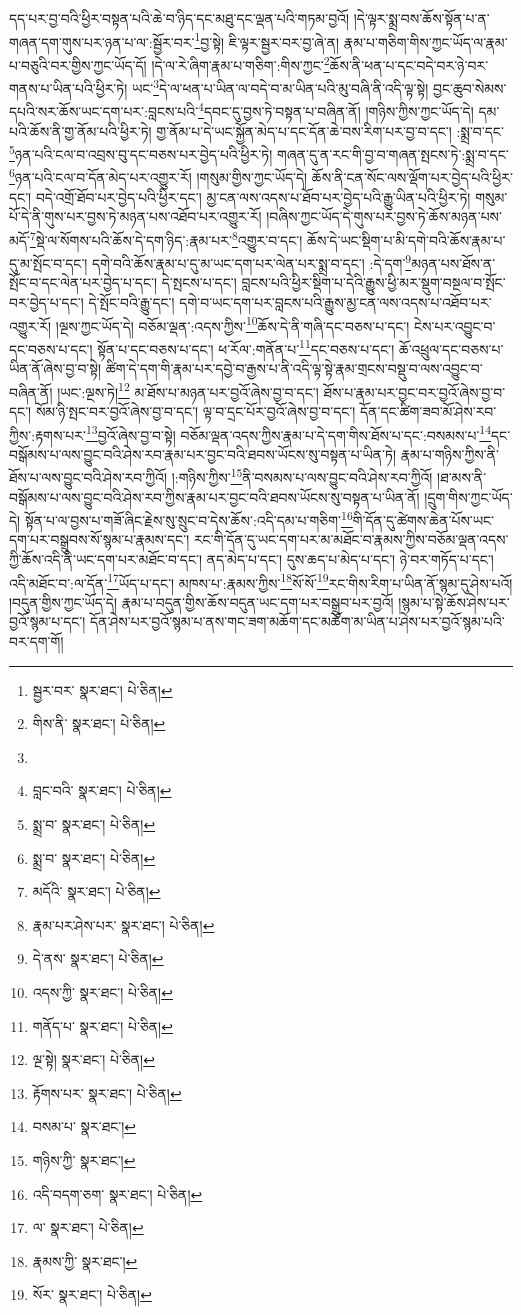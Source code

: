 དད་པར་བྱ་བའི་ཕྱིར་བསྟན་པའི་ཆེ་བ་ཉིད་དང་མཐུ་དང་ལྡན་པའི་གཏམ་བྱའོ། །དེ་ལྟར་སྨྲ་བས་ཆོས་སྟོན་པ་ན་གཞན་དག་གུས་པར་ཉན་པ་ལ་:སྦྱོར་བར་\footnote{སྦྱར་བར་  སྣར་ཐང་།  པེ་ཅིན། }བྱ་སྟེ། ཇི་ལྟར་སྦྱར་བར་བྱ་ཞེ་ན། རྣམ་པ་གཅིག་གིས་ཀྱང་ཡོད་ལ་རྣམ་པ་བཅུའི་བར་གྱིས་ཀྱང་ཡོད་དོ། །དེ་ལ་རེ་ཞིག་རྣམ་པ་གཅིག་:གིས་ཀྱང་\footnote{གིས་ནི་  སྣར་ཐང་།  པེ་ཅིན། }ཆོས་ནི་ཕན་པ་དང་བདེ་བར་ཉེ་བར་གནས་པ་ཡིན་པའི་ཕྱིར་ཏེ། ཡང་\footnote{}དེ་ལ་ཕན་པ་ཡིན་ལ་བདེ་བ་མ་ཡིན་པའི་མུ་བཞི་ནི་འདི་ལྟ་སྟེ། བྱང་ཆུབ་སེམས་དཔའི་སར་ཆོས་ཡང་དག་པར་:བླངས་པའི་\footnote{བླང་བའི་  སྣར་ཐང་།  པེ་ཅིན། }དབང་དུ་བྱས་ཏེ་བསྟན་པ་བཞིན་ནོ། །གཉིས་ཀྱིས་ཀྱང་ཡོད་དེ། དམ་པའི་ཆོས་ནི་གྱ་ནོམ་པའི་ཕྱིར་ཏེ། གྱ་ནོམ་པ་དེ་ཡང་སྐྱོན་མེད་པ་དང་དོན་ཆེ་བས་རིག་པར་བྱ་བ་དང་། :སྨྲ་བ་དང་\footnote{སྨྲ་བ་  སྣར་ཐང་།  པེ་ཅིན། }ཉན་པའི་ངལ་བ་འབྲས་བུ་དང་བཅས་པར་བྱེད་པའི་ཕྱིར་ཏེ། གཞན་དུ་ན་རང་གི་བྱ་བ་གཞན་སྤངས་ཏེ་:སྨྲ་བ་དང་\footnote{སྨྲ་བ་  སྣར་ཐང་།  པེ་ཅིན། }ཉན་པའི་ངལ་བ་དོན་མེད་པར་འགྱུར་རོ། །གསུམ་གྱིས་ཀྱང་ཡོད་དེ། ཆོས་ནི་ངན་སོང་ལས་ལྡོག་པར་བྱེད་པའི་ཕྱིར་དང་། བདེ་འགྲོ་ཐོབ་པར་བྱེད་པའི་ཕྱིར་དང་། མྱ་ངན་ལས་འདས་པ་ཐོབ་པར་བྱེད་པའི་རྒྱུ་ཡིན་པའི་ཕྱིར་ཏེ། གསུམ་པོ་དེ་ནི་གུས་པར་བྱས་ཏེ་མཉན་པས་འཐོབ་པར་འགྱུར་རོ། །བཞིས་ཀྱང་ཡོད་དེ་གུས་པར་བྱས་ཏེ་ཆོས་མཉན་པས་མདོ་\footnote{མདོའི་  སྣར་ཐང་།  པེ་ཅིན། }སྡེ་ལ་སོགས་པའི་ཆོས་དེ་དག་ཉིད་:རྣམ་པར་\footnote{རྣམ་པར་ཤེས་པར་  སྣར་ཐང་།  པེ་ཅིན། }འགྱུར་བ་དང་། ཆོས་དེ་ཡང་སྡིག་པ་མི་དགེ་བའི་ཆོས་རྣམ་པ་དུ་མ་སྤོང་བ་དང་། དགེ་བའི་ཆོས་རྣམ་པ་དུ་མ་ཡང་དག་པར་ལེན་པར་སྨྲ་བ་དང་། :དེ་དག་\footnote{དེ་ནས་  སྣར་ཐང་།  པེ་ཅིན། }མཉན་པས་ཐོས་ན་སྤོང་བ་དང་ལེན་པར་བྱེད་པ་དང་། དེ་སྤངས་པ་དང་། བླངས་པའི་ཕྱིར་སྡིག་པ་དེའི་རྒྱུས་ཕྱི་མར་སྡུག་བསྔལ་བ་སྤོང་བར་བྱེད་པ་དང་། དེ་སྤོང་བའི་རྒྱུ་དང་། དགེ་བ་ཡང་དག་པར་བླངས་པའི་རྒྱུས་མྱ་ངན་ལས་འདས་པ་འཐོབ་པར་འགྱུར་རོ། །ལྔས་ཀྱང་ཡོད་དེ། བཅོམ་ལྡན་:འདས་ཀྱིས་\footnote{འདས་ཀྱི་  སྣར་ཐང་།  པེ་ཅིན། }ཆོས་དེ་ནི་གཞི་དང་བཅས་པ་དང་། ངེས་པར་འབྱུང་བ་དང་བཅས་པ་དང་། སྟོན་པ་དང་བཅས་པ་དང་། ཕ་རོལ་:གནོན་པ་\footnote{གནོད་པ་  སྣར་ཐང་།  པེ་ཅིན། }དང་བཅས་པ་དང་། ཆོ་འཕྲུལ་དང་བཅས་པ་ཡིན་ནོ་ཞེས་བྱ་བ་སྟེ། ཚིག་དེ་དག་གི་རྣམ་པར་དབྱེ་བ་རྒྱས་པ་ནི་འདི་ལྟ་སྟེ་རྣམ་གྲངས་བསྡུ་བ་ལས་འབྱུང་བ་བཞིན་ནོ། །ཡང་:ལྔས་ཏེ།\footnote{ལྔ་སྟེ།  སྣར་ཐང་།  པེ་ཅིན། } མ་ཐོས་པ་མཉན་པར་བྱའོ་ཞེས་བྱ་བ་དང་། ཐོས་པ་རྣམ་པར་བྱང་བར་བྱའོ་ཞེས་བྱ་བ་དང་། སོམ་ཉི་སྤང་བར་བྱའོ་ཞེས་བྱ་བ་དང་། ལྟ་བ་དྲང་པོར་བྱའོ་ཞེས་བྱ་བ་དང་། དོན་དང་ཚིག་ཟབ་མོ་ཤེས་རབ་ཀྱིས་:རྟགས་པར་\footnote{རྟོགས་པར་  སྣར་ཐང་།  པེ་ཅིན། }བྱའོ་ཞེས་བྱ་བ་སྟེ། བཅོམ་ལྡན་འདས་ཀྱིས་རྣམ་པ་དེ་དག་གིས་ཐོས་པ་དང་:བསམས་པ་\footnote{བསམ་པ་  སྣར་ཐང་། }དང་བསྒོམས་པ་ལས་བྱུང་བའི་ཤེས་རབ་རྣམ་པར་བྱང་བའི་ཐབས་ཡོངས་སུ་བསྟན་པ་ཡིན་ཏེ། རྣམ་པ་གཉིས་ཀྱིས་ནི་ཐོས་པ་ལས་བྱུང་བའི་ཤེས་རབ་ཀྱིའོ། །:གཉིས་ཀྱིས་\footnote{གཉིས་ཀྱི་  སྣར་ཐང་། }ནི་བསམས་པ་ལས་བྱུང་བའི་ཤེས་རབ་ཀྱིའོ། །ཐ་མས་ནི་བསྒོམས་པ་ལས་བྱུང་བའི་ཤེས་རབ་ཀྱིས་རྣམ་པར་བྱང་བའི་ཐབས་ཡོངས་སུ་བསྟན་པ་ཡིན་ནོ། །དྲུག་གིས་ཀྱང་ཡོད་དེ། སྟོན་པ་ལ་བྱས་པ་གཟོ་ཞིང་རྗེས་སུ་སྲུང་བ་དེས་ཆོས་:འདི་དམ་པ་གཅིག་\footnote{འདི་བདག་ཅག་  སྣར་ཐང་།  པེ་ཅིན། }གི་དོན་དུ་ཚེགས་ཆེན་པོས་ཡང་དག་པར་བསྒྲུབས་སོ་སྙམ་པ་རྣམས་དང་། རང་གི་དོན་དུ་ཡང་དག་པར་མ་མཐོང་བ་རྣམས་ཀྱིས་བཅོམ་ལྡན་འདས་ཀྱི་ཆོས་འདི་ནི་ཡང་དག་པར་མཐོང་བ་དང་། ནད་མེད་པ་དང་། དུས་ཆད་པ་མེད་པ་དང་། ཉེ་བར་གཏོད་པ་དང་། འདི་མཐོང་བ་:ལ་དོན་\footnote{ལ་  སྣར་ཐང་།  པེ་ཅིན། }ཡོད་པ་དང་། མཁས་པ་:རྣམས་ཀྱིས་\footnote{རྣམས་ཀྱི་  སྣར་ཐང་། }སོ་སོ་\footnote{སོར་  སྣར་ཐང་།  པེ་ཅིན། }རང་གིས་རིག་པ་ཡིན་ནོ་སྙམ་དུ་ཤེས་པའོ། །བདུན་གྱིས་ཀྱང་ཡོད་དེ། རྣམ་པ་བདུན་གྱིས་ཆོས་བདུན་ཡང་དག་པར་བསྒྲུབ་པར་བྱའོ། །སྙམ་པ་སྟེ་ཆོས་ཤེས་པར་བྱའོ་སྙམ་པ་དང་། དོན་ཤེས་པར་བྱའོ་སྙམ་པ་ནས་གང་ཟག་མཆོག་དང་མཆོག་མ་ཡིན་པ་ཤེས་པར་བྱའོ་སྙམ་པའི་བར་དག་གོ། 